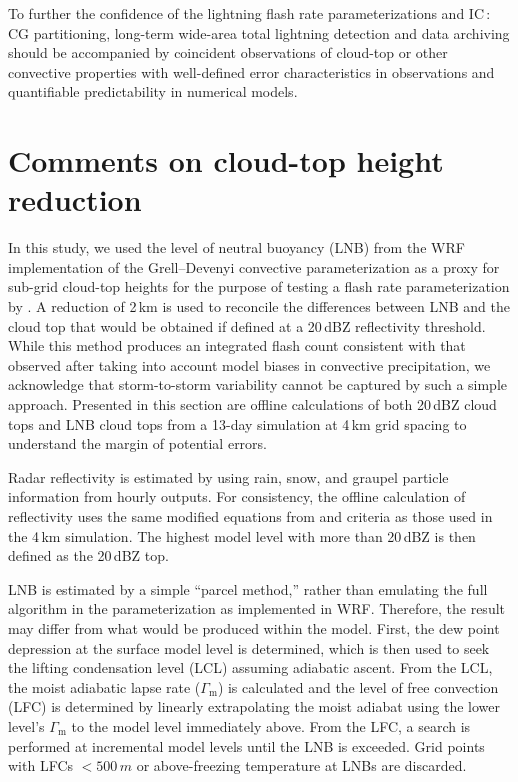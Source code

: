 To further the confidence of the lightning flash rate parameterizations and
IC\,:\,CG partitioning, long-term wide-area total lightning detection and
data archiving should be accompanied by coincident observations of cloud-top
or other convective properties with well-defined error characteristics in
observations and quantifiable predictability in numerical models.

\section{Comments on cloud-top height reduction} \label{apdx:lightning/ktop}

In this study, we used the level of neutral buoyancy (LNB) from the WRF
implementation of the Grell--Devenyi convective parameterization
\citep{Grell:2002bs} as a proxy for sub-grid cloud-top heights for the
purpose of testing a flash rate parameterization by
\citet{Price:1992wb,Price:1993fk,Price:1994fk}. A reduction of 2\,\unit{km}
is used to reconcile the differences between LNB and the cloud top that would
be obtained if defined at a 20\,\unit{dBZ} reflectivity threshold.
While this method produces an integrated flash count consistent with that
observed after taking into account model biases in convective precipitation,
we acknowledge that storm-to-storm variability cannot be captured by such a
simple \mbox{approach}. Presented in this section are offline calculations of both
20\,\unit{dBZ} cloud tops and LNB cloud tops from a 13-day simulation at
4\,\unit{km} grid spacing to understand the margin of potential errors.

Radar reflectivity is estimated by using rain, snow, and graupel particle
information from hourly outputs. For consistency, the offline calculation of
reflectivity uses the same modified equations from \citet{Smith:1975fk} and
criteria as those used in the 4\,\unit{km} simulation. The highest model
level with more than 20\,\unit{dBZ} is then defined as the 20\,\unit{dBZ}
top.

LNB is estimated by a simple ``parcel method,'' rather than emulating the
full algorithm in the parameterization as implemented in WRF. Therefore, the
result may differ from what would be produced within the model. First, the
dew point depression at the surface model level is determined, which is then
used to seek the lifting condensation level (LCL) assuming adiabatic ascent.
From the LCL, the moist adiabatic lapse rate ($\Gamma_\textrm{m}$) is calculated and
the level of free convection (LFC) is determined by linearly extrapolating
the moist adiabat using the lower level's $\Gamma_\textrm{m}$ to the model level
immediately above. From the LFC, a search is performed at incremental model
levels until the LNB is exceeded. Grid points with LFCs $< 500\,\unit{m}$ or
above-freezing temperature at LNBs are discarded.

